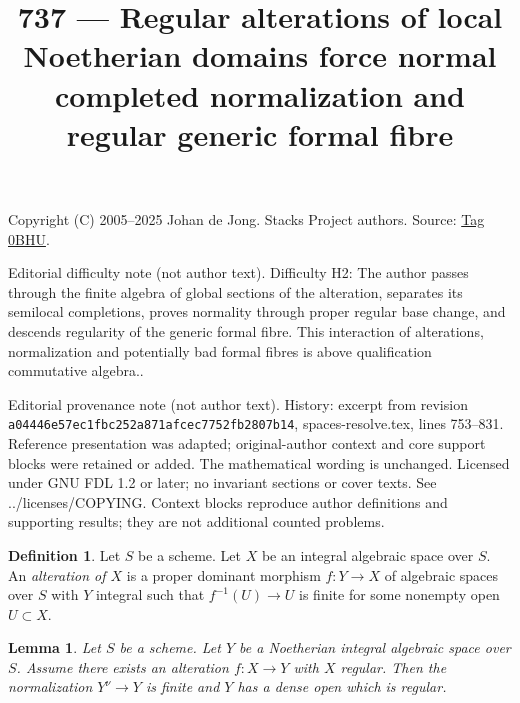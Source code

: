 \documentclass{amsart}
\theoremstyle{plain}
\newtheorem{lemma}[subsection]{Lemma}
\theoremstyle{definition}
\newtheorem{definition}[subsection]{Definition}
\theoremstyle{remark}
\numberwithin{equation}{subsection}
\begin{document}
\title[Stacks Project, Tag 0BHU]{737 --- Regular alterations of local Noetherian domains force normal completed normalization and regular generic formal fibre}
\maketitle
\noindent Copyright (C) 2005--2025 Johan de Jong. Stacks Project authors. Source: \href{https://stacks.math.columbia.edu/tag/0BHU}{Tag 0BHU}.

\noindent Editorial difficulty note (not author text). Difficulty H2: The author passes through the finite algebra of global sections of the alteration, separates its semilocal completions, proves normality through proper regular base change, and descends regularity of the generic formal fibre. This interaction of alterations, normalization and potentially bad formal fibres is above qualification commutative algebra..

\noindent Editorial provenance note (not author text). History: excerpt from revision \texttt{a0444\allowbreak 6e57e\allowbreak c1fbc\allowbreak 252a8\allowbreak 71afc\allowbreak ec775\allowbreak 2fb28\allowbreak 07b14}, spaces-resolve.tex, lines 753--831. Reference presentation was adapted; original-author context and core support blocks were retained or added. The mathematical wording is unchanged. Licensed under GNU FDL 1.2 or later; no invariant sections or cover texts. See ../licenses/COPYING. Context blocks reproduce author definitions and supporting results; they are not additional counted problems.

\begin{definition}
\label{spaces-over-fields-definition-alteration}
Let $S$ be a scheme. Let $X$ be an integral algebraic space over $S$.
An {\it alteration of $X$} is a proper dominant morphism $f : Y \to X$
of algebraic spaces over $S$ with $Y$ integral such that $f^{-1}(U) \to U$
is finite for some nonempty open $U \subset X$.
\end{definition}

\begin{lemma}
\label{lemma-regular-alteration-implies}
Let $S$ be a scheme. Let $Y$ be a Noetherian integral algebraic space
over $S$. Assume there exists an alteration
$f : X \to Y$ with $X$ regular. Then the normalization $Y^\nu \to Y$
is finite and $Y$ has a dense open which is regular.
\end{lemma}
\end{document}
